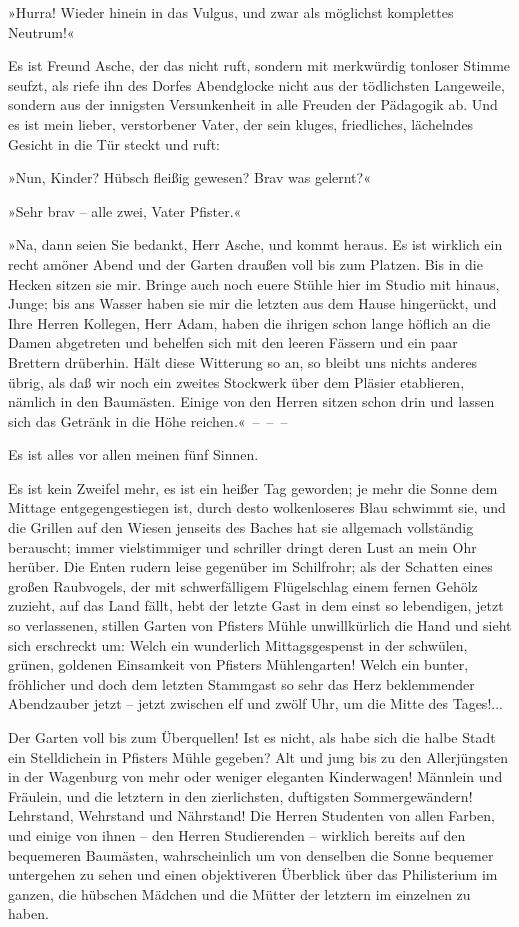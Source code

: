 »Hurra! Wieder hinein in das Vulgus, und zwar als möglichst
komplettes Neutrum!«

Es ist Freund Asche, der das nicht ruft, sondern mit merkwürdig
tonloser Stimme seufzt, als riefe ihn des Dorfes Abendglocke nicht
aus der tödlichsten Langeweile, sondern aus der innigsten
Versunkenheit in alle Freuden der Pädagogik ab. Und es ist mein
lieber, verstorbener Vater, der sein kluges, friedliches,
lächelndes Gesicht in die Tür steckt und ruft:

»Nun, Kinder? Hübsch fleißig gewesen? Brav was gelernt?«

»Sehr brav – alle zwei, Vater Pfister.«

»Na, dann seien Sie bedankt, Herr Asche, und kommt heraus. Es ist
wirklich ein recht amöner Abend und der Garten draußen voll bis zum
Platzen. Bis in die Hecken sitzen sie mir. Bringe auch noch euere
Stühle hier im Studio mit hinaus, Junge; bis ans Wasser haben sie
mir die letzten aus dem Hause hingerückt, und Ihre Herren Kollegen,
Herr Adam, haben die ihrigen schon lange höflich an die Damen
abgetreten und behelfen sich mit den leeren Fässern und ein paar
Brettern drüberhin. Hält diese Witterung so an, so bleibt uns
nichts anderes übrig, als daß wir noch ein zweites Stockwerk über
dem Pläsier etablieren, nämlich in den Baumästen. Einige von den
Herren sitzen schon drin und lassen sich das Getränk in die Höhe
reichen.«~–~–~–

Es ist alles vor allen meinen fünf Sinnen.

Es ist kein Zweifel mehr, es ist ein heißer Tag geworden; je mehr
die Sonne dem Mittage entgegengestiegen ist, durch desto
wolkenloseres Blau schwimmt sie, und die Grillen auf den Wiesen
jenseits des Baches hat sie allgemach vollständig berauscht; immer
vielstimmiger und schriller dringt deren Lust an mein Ohr herüber.
Die Enten rudern leise gegenüber im Schilfrohr; als der Schatten
eines großen Raubvogels, der mit schwerfälligem Flügelschlag einem
fernen Gehölz zuzieht, auf das Land fällt, hebt der letzte Gast in
dem einst so lebendigen, jetzt so verlassenen, stillen Garten von
Pfisters Mühle unwillkürlich die Hand und sieht sich erschreckt um:
Welch ein wunderlich Mittagsgespenst in der schwülen, grünen,
goldenen Einsamkeit von Pfisters Mühlengarten! Welch ein bunter,
fröhlicher und doch dem letzten Stammgast so sehr das Herz
beklemmender Abendzauber jetzt – jetzt zwischen elf und zwölf Uhr,
um die Mitte des Tages!...

Der Garten voll bis zum Überquellen! Ist es nicht, als habe sich
die halbe Stadt ein Stelldichein in Pfisters Mühle gegeben? Alt und
jung bis zu den Allerjüngsten in der Wagenburg von mehr oder
weniger eleganten Kinderwagen! Männlein und Fräulein, und die
letztern in den zierlichsten, duftigsten Sommergewändern!
Lehrstand, Wehrstand und Nährstand! Die Herren Studenten von allen
Farben, und einige von ihnen – den Herren Studierenden – wirklich
bereits auf den bequemeren Baumästen, wahrscheinlich um von
denselben die Sonne bequemer untergehen zu sehen und einen
objektiveren Überblick über das Philisterium im ganzen, die
hübschen Mädchen und die Mütter der letztern im einzelnen zu
haben.

